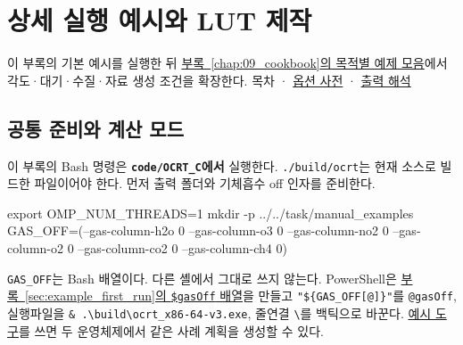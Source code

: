 \chapter{상세 실행 예시와 LUT 제작}
\label{chap:04_examples}
이 부록의 기본 예시를 실행한 뒤 \hyperref[chap:09_cookbook]{부록~\ref*{chap:09_cookbook}의 목적별 예제 모음}에서 각도·대기·수질·자료 생성 조건을 확장한다.
목차 · \hyperref[chap:03_options]{옵션 사전} · \hyperref[chap:05_output_formats]{출력 해석}

\section{공통 준비와 계산 모드}
\label{sec:auto:04_examples:1}
이 부록의 Bash 명령은 \textbf{\texttt{code/\allowbreak{}OCRT\_\allowbreak{}C}에서} 실행한다. \texttt{.\allowbreak{}/\allowbreak{}build/\allowbreak{}ocrt}는 현재 소스로 빌드한 파일이어야 한다. 먼저 출력 폴더와 기체흡수 off 인자를 준비한다.


\par\noindent\begin{minipage}{\linewidth}
\begin{ManualCode}
export OMP_NUM_THREADS=1
mkdir -p ../../task/manual_examples
GAS_OFF=(--gas-column-h2o 0 --gas-column-o3 0 --gas-column-no2 0
         --gas-column-o2 0 --gas-column-co2 0 --gas-column-ch4 0)
\end{ManualCode}
\end{minipage}\par

\texttt{GAS\_\allowbreak{}OFF}는 Bash 배열이다. 다른 셸에서 그대로 쓰지 않는다. PowerShell은 \hyperref[sec:example_first_run]{부록~\ref*{sec:example_first_run}의 \texttt{\$gasOff} 배열}을 만들고 \texttt{"\$\{GAS\_\allowbreak{}OFF[@]\}"}를 \texttt{@gasOff}, 실행파일을 \texttt{\& .\allowbreak{}\textbackslash{}build\textbackslash{}ocrt\_\allowbreak{}x86-\allowbreak{}64-\allowbreak{}v3.\allowbreak{}exe}, 줄연결 \texttt{\textbackslash{}}를 백틱으로 바꾼다. \hyperref[chap:examples_readme]{예시 도구}를 쓰면 두 운영체제에서 같은 사례 계획을 생성할 수 있다.


